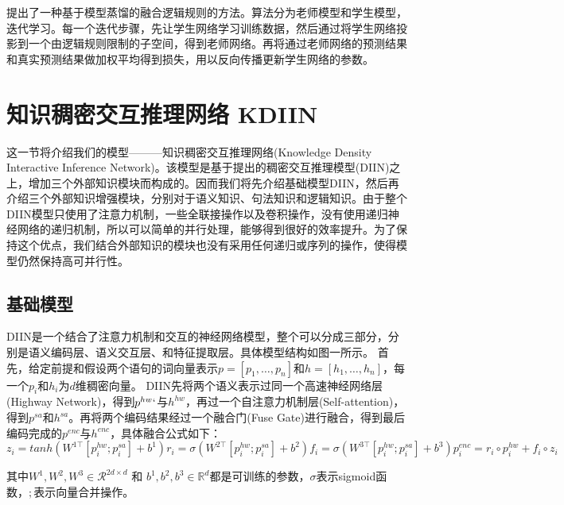 \documentclass[UTF8,11pt,a4paper,nofonts]{ctexart}
\begin{document}
\cite{}提出了一种基于模型蒸馏的融合逻辑规则的方法。算法分为老师模型和学生模型，迭代学习。每一个迭代步骤，先让学生网络学习训练数据，然后通过将学生网络投影到一个由逻辑规则限制的子空间，得到老师网络。再将通过老师网络的预测结果和真实预测结果做加权平均得到损失，用以反向传播更新学生网络的参数。





\newpage
\section{知识稠密交互推理网络 KDIIN}

这一节将介绍我们的模型———知识稠密交互推理网络(Knowledge Density Interactive Inference Network)。该模型是基于\cite{}提出的稠密交互推理模型(DIIN)之上，增加三个外部知识模块而构成的。因而我们将先介绍基础模型DIIN，然后再介绍三个外部知识增强模块，分别对于语义知识、句法知识和逻辑知识。由于整个DIIN模型只使用了注意力机制，一些全联接操作以及卷积操作，没有使用递归神经网络的递归机制，所以可以简单的并行处理，能够得到很好的效率提升。为了保持这个优点，我们结合外部知识的模块也没有采用任何递归或序列的操作，使得模型仍然保持高可并行性。

\subsection{基础模型}

DIIN是一个结合了注意力机制和交互的神经网络模型，整个可以分成三部分，分别是语义编码层、语义交互层、和特征提取层。具体模型结构如图一所示。
首先，给定前提和假设两个语句的词向量表示$p=[p_1,\dots,p_n]$和$h=[h_1, \dots, h_n]$，每一个$p_i$和$h_i$为$d$维稠密向量。
DIIN先将两个语义表示过同一个高速神经网络层(Highway Network)，得到$p^{hw}`$与$h^{hw}$，再过一个自注意力机制层(Self-attention)，得到$p^{sa}$和$h^{sa}$。再将两个编码结果经过一个融合门(Fuse Gate)进行融合，得到最后编码完成的$p^{enc}$与$h^{enc}$，具体融合公式如下：
\begin{equation}
z_i = tanh(W^{1\top}[p^{hw}_i;p^{sa}_i]+b^1)

r_i = \sigma(W^{2\top}[p^{hw}_i;p^{sa}_i]+b^2)

f_i = \sigma(W^{3\top}[p^{hw}_i;p^{sa}_i]+b^3)

p^{enc}_i = r_i \circ p^{hw}_i + f_i \circ z_i
\end{equation}

其中$W^1, W^2, W^3 \in \mathcal{R}^{2d\times d}$ 和 $b^1, b^2, b^3 \in \mathbb{R}^d$都是可训练的参数，$\sigma$表示sigmoid函数，$;$表示向量合并操作。
\end{document}
